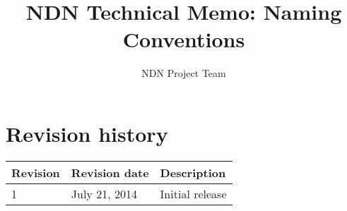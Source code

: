 \documentclass[10pt]{article}
\title{NDN Technical Memo: Naming Conventions}
\author{NDN Project Team}
\date{}
\begin{document}
\maketitle

\section*{Revision history}

\begin{center}
\begin{tabular}{|l|l|p{10cm}|}
\hline
\bf Revision & \bf Revision date & \bf Description \\
\hline
1 & July 21, 2014 & Initial release \\
\hline
\end{tabular}
\end{center}




% 




\end{document}
